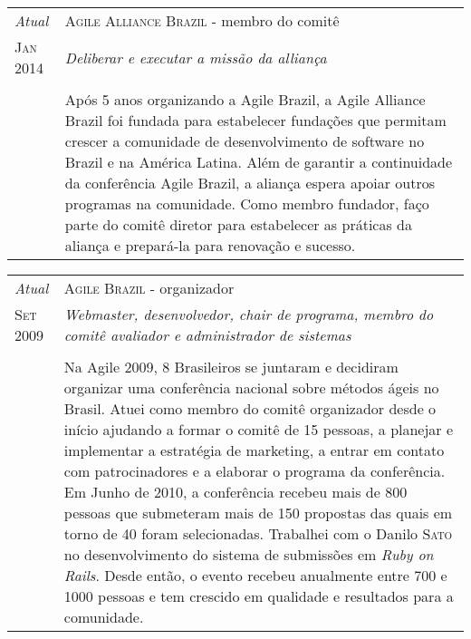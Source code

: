 \documentclass[letter,10pt]{article}
\begin{document}
\begin{tabular}{p{2.5cm}|p{13.5cm}}
  \emph{Atual} & \textsc{Agile Alliance Brazil} - membro do comitê\\
  \textsc{Jan 2014}& \emph{Deliberar e executar a missão da alliança}\\
  &\\
  & Após 5 anos organizando a Agile Brazil, a Agile Alliance Brazil foi
  fundada para estabelecer fundações que permitam crescer a comunidade
  de desenvolvimento de software no Brazil e na América Latina. Além de
  garantir a continuidade da conferência Agile Brazil, a aliança espera
  apoiar outros programas na comunidade. Como membro fundador, faço parte
  do comitê diretor para estabelecer as práticas da aliança e prepará-la
  para renovação e sucesso.
\end{tabular}

\begin{tabular}{p{2.5cm}|p{13.5cm}}
  \emph{Atual} & \textsc{Agile Brazil} - organizador\\
  \textsc{Set 2009}& \emph{Webmaster, desenvolvedor, \textit{chair} de programa, membro do comitê avaliador e administrador de sistemas}\\
  &\\
  & Na Agile 2009, 8 Brasileiros se juntaram e decidiram organizar
  uma conferência nacional sobre métodos ágeis no Brasil. Atuei como
  membro do comitê organizador desde o início ajudando a formar o
  comitê de 15 pessoas, a planejar e implementar a estratégia de
  marketing, a entrar em contato com patrocinadores e a elaborar o
  programa da conferência. Em Junho de 2010, a conferência
  recebeu mais de 800 pessoas que submeteram mais de 150 propostas das
  quais em torno de 40 foram selecionadas. Trabalhei com o Danilo
  \textsc{Sato} no desenvolvimento do sistema de submissões em
  \textit{Ruby on Rails}. Desde então, o evento recebeu anualmente
  entre 700 e 1000 pessoas e tem crescido em qualidade e resultados
  para a comunidade.
\end{tabular}
\end{document}
